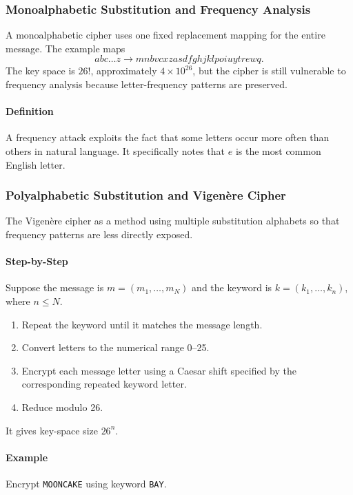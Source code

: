 \documentclass[12pt]{article}
\newcommand{\Definition}{\paragraph{Definition}}
\newcommand{\Step}{\paragraph{Step-by-Step}}
\newcommand{\Example}{\paragraph{Example}}
\begin{document}
\subsubsection{Monoalphabetic Substitution and Frequency Analysis}
A monoalphabetic cipher uses one fixed replacement mapping for the entire message. The example maps
\[
abc\ldots z\rightarrow mnbvcxzasdfghjklpoiuytrewq.
\]
The key space is $26!$, approximately $4\times10^{26}$, but the cipher is still vulnerable to frequency analysis because letter-frequency patterns are preserved.

\Definition A frequency attack exploits the fact that some letters occur more often than others in natural language. It specifically notes that $e$ is the most common English letter.

\subsubsection{Polyalphabetic Substitution and Vigen\`ere Cipher}
The Vigen\`ere cipher as a method using multiple substitution alphabets so that frequency patterns are less directly exposed.

\Step
Suppose the message is $m=(m_1,\ldots,m_N)$ and the keyword is $k=(k_1,\ldots,k_n)$, where $n\le N$.
\begin{enumerate}
    \item Repeat the keyword until it matches the message length.
    \item Convert letters to the numerical range 0--25.
    \item Encrypt each message letter using a Caesar shift specified by the corresponding repeated keyword letter.
    \item Reduce modulo 26.
\end{enumerate}
It gives key-space size $26^n$.

\Example Encrypt \texttt{MOONCAKE} using keyword \texttt{BAY}.
\end{document}
